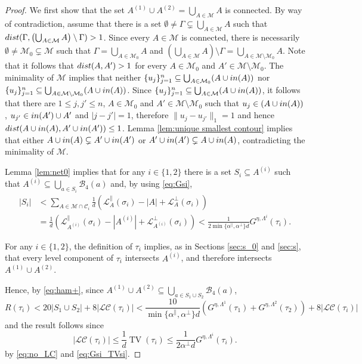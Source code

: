 \documentclass[11pt, reqno]{amsart}
\DeclareMathOperator{\TV}{TV}
\numberwithin{equation}{section}
\begin{document}
\begin{proof} 
We first show that the set $A^{(1)}\cup A^{(2)}=\bigcup_{A\in\mathcal{M}}A$ is connected.
By way of contradiction, assume that there is a set $\emptyset\neq\Gamma\subsetneq \bigcup_{A\in\mathcal{M}}A$ such that ${\rm dist}(\Gamma,\left(\bigcup_{A\in\mathcal{M}}A\right)\setminus\Gamma)>1$.
Since every $A\in\mathcal{M}$ is connected, there is necessarily $\emptyset\neq\mathcal{M}_0\subsetneq\mathcal{M}$ such that $\Gamma=\bigcup_{A\in\mathcal{M}_0}A$ and $\left(\bigcup_{A\in\mathcal{M}}A\right)\setminus\Gamma=\bigcup_{A\in\mathcal{M}\setminus\mathcal{M}_0}A$.
Note that it follows that ${\rm dist}(A,A')>1$ for every $A\in\mathcal{M}_0$ and $A'\in\mathcal{M}\setminus\mathcal{M}_0$.
The minimality of $\mathcal M$ implies that neither $\{u_j\}_{j=1}^n\subseteq\bigcup_{A\in\mathcal{M}_0}( A\cup{\rm in}(A))$ nor $\{u_j\}_{j=1}^n\subseteq\bigcup_{A\in\mathcal{M}\setminus\mathcal{M}_0}( A\cup{\rm in}(A))$.
Since $\{u_j\}_{j=1}^n\subseteq\bigcup_{A\in\mathcal{M}}( A\cup{\rm in}(A))$, it follows that
there are $1\leq j,j'\leq n$, $A\in\mathcal{M}_0$ and $A'\in\mathcal{M}\setminus\mathcal{M}_0$ such that $u_j\in( A\cup{\rm in}(A))$, $u_{j'}\in{\rm in}(A')\cup A'$ and $\lvert j-j'\rvert=1$, therefore $\lVert u_j-u_{j'}\rVert_1=1$ and hence ${\rm dist}(A\cup{\rm in}(A),A'\cup{\rm in}(A'))\leq 1$. 
Lemma \ref{lem:unique smallest contour} implies that either
$A\cup{\rm in}(A)\subsetneq A'\cup{\rm in}(A')$ or $A'\cup{\rm in}(A')\subsetneq A\cup{\rm in}(A)$, contradicting the minimality of $\mathcal M$.

Lemma \ref{lem:net0} implies that for any $i\in\{1,2\}$ there is a set $S_i\subseteq A^{(i)}$ such that 
$A^{(i)}\subseteq\bigcup_{a\in S_i}{\mathcal B}_4(a)$ and, by using \eqref{eq:Gsi},
\begin{align*}
\lvert S_i\rvert&<\sum_{A\in
\mathcal{M}\cap\mathcal{C}_i}\frac{1}{d}\left(\mathcal{L}^{\parallel}_A(\sigma_i)-|A|+\mathcal{L}^{\perp}_A(\sigma_i)\right)\\
&=\frac{1}{d}\left(\mathcal{L}^{\parallel}_{A^{(i)}}(\sigma_i)-|A^{(i)}|+\mathcal{L}^{\perp}_{A^{(i)}}(\sigma_i)\right)<\frac{1}{2\min \{\alpha^{\parallel}, \alpha^{\perp} \} d}G^{\eta,\Lambda^{i}}({\tau}_i).
\end{align*}

For any $i\in\{1,2\}$, the definition of ${\tau}_i$ implies, as in Sections \ref{sec:s_0} and \ref{sec:s}, that every level component of ${\tau}_i$ intersects $A^{(i)}$, and therefore intersects $A^{(1)}\cup A^{(2)}$.

Hence, by \eqref{eq:ham+}, 
since $A^{(1)}\cup A^{(2)}\subseteq\bigcup_{a\in S_1\cup S_2}{\mathcal B}_4(a)$,
$$
R({\tau}_i)<20\lvert S_1\cup S_2\rvert+8\lvert\mathcal{LC}({\tau}_i)\rvert<\frac{10}{\min \{\alpha^{\parallel}, \alpha^{\perp} \}d }\left(G^{\eta,\Lambda^{1}}({\tau}_1)+G^{\eta,\Lambda^{2}}({\tau}_2)\right)+8\lvert\mathcal{LC}({\tau}_i)\rvert
$$
and the result follows since
\begin{equation*}
\lvert\mathcal{LC}({\tau}_i)\rvert\leq\frac{1}{d}\TV({\tau}_i)\leq \frac{1}{2\alpha^{\perp}d}G^{\eta,\Lambda^i}({\tau}_i).
\end{equation*}
by \eqref{eq:no_LC} 
and \eqref{eq:Gsi_TVsi}.
\end{proof}
\end{document}
